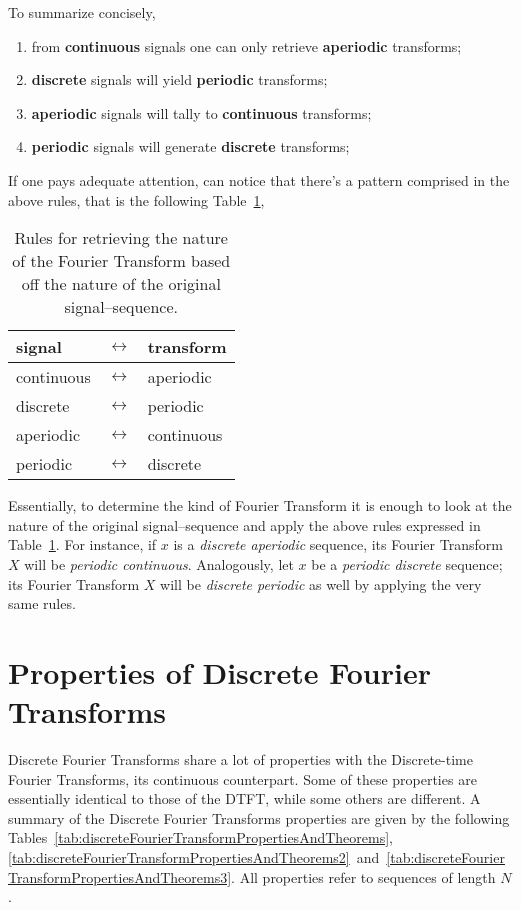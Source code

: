 \documentclass[\documentfontsize, twocolumn]{\classname}
\begin{document}
To summarize concisely,
\begin{enumerate}
    \item from \textbf{continuous} signals one can only retrieve \textbf{aperiodic} transforms;
    \item \textbf{discrete} signals will yield \textbf{periodic} transforms;
    \item \textbf{aperiodic} signals will tally to \textbf{continuous} transforms;
    \item \textbf{periodic} signals will generate \textbf{discrete} transforms;
\end{enumerate}

If one pays adequate attention, can notice that there's a pattern comprised in the above rules, that is the following Table~\ref{tab:fourierTransformRules},
\begin{table}[ht]
\centering
\begin{tabular}{|l|c|l|}
    \hline
    \textbf{signal} & $\longleftrightarrow$ & \textbf{transform} \\
    \hline
    continuous & $\longleftrightarrow$ & aperiodic\\
    \hline
    discrete & $\longleftrightarrow$ & periodic\\
    \hline
    aperiodic & $\longleftrightarrow$ & continuous\\
    \hline
    periodic & $\longleftrightarrow$ & discrete\\
    \hline
\end{tabular}
\caption{Rules for retrieving the nature of the Fourier Transform based off the nature of the original signal--sequence.}\label{tab:fourierTransformRules}
\end{table}

Essentially, to determine the kind of Fourier Transform it is enough to look at the nature of the original signal--sequence and apply the above rules expressed in Table~\ref{tab:fourierTransformRules}. For instance, if $x$ is a \emph{discrete aperiodic} sequence, its Fourier Transform $X$ will be \emph{periodic continuous}. Analogously, let $x$ be a \emph{periodic discrete} sequence; its Fourier Transform $X$ will be \emph{discrete periodic} as well by applying the very same rules.

\section{Properties of Discrete Fourier Transforms}

Discrete Fourier Transforms share a lot of properties with the Discrete-time Fourier Transforms, its continuous counterpart. Some of these properties are essentially identical to those of the DTFT, while some others are different. A summary of the Discrete Fourier Transforms properties are given by the following Tables~\ref{tab:discreteFourierTransformPropertiesAndTheorems}, \ref{tab:discreteFourierTransformPropertiesAndTheorems2}~and~\ref{tab:discreteFourierTransformPropertiesAndTheorems3}. All properties refer to sequences of length $N$.
\end{document}
